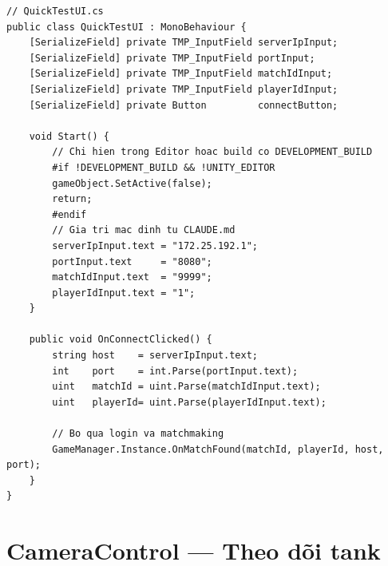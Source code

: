 \documentclass[12pt,a4paper]{report}
\begin{document}
\begin{lstlisting}[style=bashStyle, caption={Quick Test Mode --- kết nối trực tiếp không qua REST}, label={lst:quicktest}]
// QuickTestUI.cs
public class QuickTestUI : MonoBehaviour {
    [SerializeField] private TMP_InputField serverIpInput;
    [SerializeField] private TMP_InputField portInput;
    [SerializeField] private TMP_InputField matchIdInput;
    [SerializeField] private TMP_InputField playerIdInput;
    [SerializeField] private Button         connectButton;

    void Start() {
        // Chi hien trong Editor hoac build co DEVELOPMENT_BUILD
        #if !DEVELOPMENT_BUILD && !UNITY_EDITOR
        gameObject.SetActive(false);
        return;
        #endif
        // Gia tri mac dinh tu CLAUDE.md
        serverIpInput.text = "172.25.192.1";
        portInput.text     = "8080";
        matchIdInput.text  = "9999";
        playerIdInput.text = "1";
    }

    public void OnConnectClicked() {
        string host    = serverIpInput.text;
        int    port    = int.Parse(portInput.text);
        uint   matchId = uint.Parse(matchIdInput.text);
        uint   playerId= uint.Parse(playerIdInput.text);

        // Bo qua login va matchmaking
        GameManager.Instance.OnMatchFound(matchId, playerId, host, port);
    }
}
\end{lstlisting}

\section{CameraControl --- Theo dõi tank}
\end{document}

